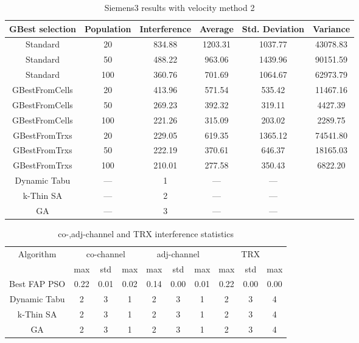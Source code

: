 \begin{table}[H]
\centering
	\begin{tabular}{cccccc}
	\toprule
    GBest selection & Population & Interference & Average & Std. Deviation & Variance \\
    \midrule
    Standard & 20 & 834.88 & 1203.31 & 1037.77 & 43078.83\\
    Standard & 50 & 488.22 & 963.06 & 1439.96 & 90151.59\\
    Standard & 100 & 360.76 & 701.69 & 1064.67 & 62973.79\\
    GBestFromCells & 20 & 413.96 & 571.54 & 535.42 & 11467.16\\
    GBestFromCells & 50 & 269.23 & 392.32 & 319.11 & 4427.39\\
    GBestFromCells & 100 & 221.26 & 315.09 & 203.02 & 2289.75\\
    GBestFromTrxs & 20 & 229.05 & 619.35 & 1365.12 & 74541.80\\
    GBestFromTrxs & 50 & 222.19 & 370.61 & 646.37 & 18165.03\\
    GBestFromTrxs & 100 & 210.01 & 277.58 & 350.43 & 6822.20\\
    Dynamic Tabu & --- & 1 & --- & --- \\
    k-Thin SA & --- & 2 & --- & --- \\
    GA & --- & 3 & --- & --- \\
    \bottomrule
	\end{tabular}
\caption{Siemens3 results with velocity method 2}
\label{tab:siem2m2}
\end{table}
\begin{table}[H]
\centering
	\begin{tabular}{cccccccccc}
	\toprule
    Algorithm & \multicolumn{3}{c}{co-channel} & \multicolumn{3}{c}{adj-channel} & \multicolumn{3}{c}{TRX}\\
              & max & std & max
              & max & std & max
              & max & std & max\\
    \midrule
    Best FAP PSO & 0.22 & 0.01 & 0.02 & 0.14 & 0.00 & 0.01 & 0.22 & 0.00 & 0.00 \\
    Dynamic Tabu & 2 & 3 & 1 & 2 & 3 & 1 & 2 & 3 & 4\\\hline
    k-Thin SA & 2 & 3 & 1 & 2 & 3 & 1 & 2 & 3 & 4\\\hline
    GA & 2 & 3 & 1 & 2 & 3 & 1 & 2 & 3 & 4\\\hline
    \bottomrule
	\end{tabular}
\caption{co-,adj-channel and TRX interference statistics}
\label{tab:stats-siem2m1}
\end{table}
